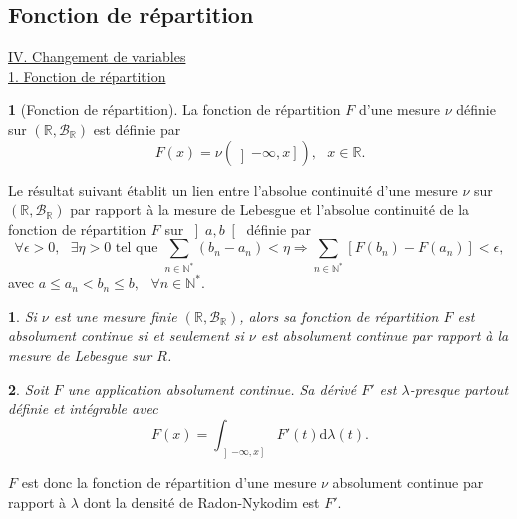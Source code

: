 \documentclass[8pt,notheorems]{beamer}
\def \N{\mathbb N}
\def \R{\mathbb{R}}
\newtheorem{theorem}{\translate{Theorem}}[section]
\newtheorem{theorem}{\translate{Theoreme}}
\theoremstyle{definition}
\newtheorem{definition}{\translate{Definition}}
\theoremstyle{example}
\theoremstyle{mystyle}
\theoremstyle{plain}
\begin{document}
\subsection{Fonction de répartition}
\begin{frame}[allowframebreaks]
\underline{IV. Changement de variables}\\
\underline{1. Fonction de répartition}\\
\begin{definition}[Fonction de répartition]
La fonction de répartition $F$ d'une mesure $\nu$ définie sur $(\R,\mathcal{B}_\R)$ est définie par 
$$
F(x) = \nu(\left]-\infty,x\right]),\text{ }x\in \R. 
$$ 
\end{definition}
Le résultat suivant établit un lien entre l'absolue continuité d'une mesure $\nu$ sur $(\R,\mathcal{B}_\R)$ par rapport à la mesure de Lebesgue et l'absolue continuité de la fonction de répartition $F$ sur $\left]a,b\right[$ définie par 
$$
\forall \epsilon>0,\text{ }\exists \eta >0\text{ tel que }\sum_{n\in\N^\ast }(b_n-a_n)<\eta\Rightarrow \sum_{n\in\N^\ast }[F(b_n)-F(a_n)]<\epsilon,
$$
avec $a\leq a_n<b_n\leq b,\text{ }\forall n\in\N^\ast$.
\begin{theorem}
Si $\nu$ est une mesure finie $(\R,\mathcal{B}_\R)$, alors sa fonction de répartition $F$ est absolument continue si et seulement si $\nu$ est absolument continue par rapport à la mesure de Lebesgue sur $R$. 
\end{theorem}
\begin{theorem}
Soit $F$ une application absolument continue. Sa dérivé $F'$ est $\lambda$-presque partout définie et intégrable avec
$$
F(x) = \int_{\left]-\infty,x\right]}F'(t)\text{d}\lambda(t).
$$
\end{theorem}
$F$ est donc la fonction de répartition d'une mesure $\nu$ absolument continue par rapport à $\lambda$ dont la densité de Radon-Nykodim est $F'$.
\end{frame}
\end{document}
